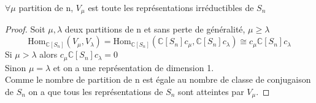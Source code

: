 \begin{theorem}[IrreductibleRepresentationSn]
    \label{IrreductibleRepresentationSn}
    $\forall \mu$ partition de n, $V_{\mu}$ est toute les représentations irréductibles de $S_n$
\end{theorem}
\begin{proof}
    Soit $\mu, \lambda$ deux partitions de n et sans perte de généralité, $\mu \geq \lambda$\\
    \[ \text{Hom}_{\mathbb{C}[S_{n}]}(V_{\mu}, V_{\lambda}) = \text{Hom}_{\mathbb{C}[S_{n}]}(\mathbb{C}[S_{n}]c_{\mu}, \mathbb{C}[S_{n}]c_{\lambda}) \cong c_{\mu}\mathbb{C}[S_{n}]c_{\lambda}  \]
    Si $\mu > \lambda$ alors $c_{\mu}\mathbb{C}[S_{n}]c_{\lambda} = 0$\\
    Sinon $\mu = \lambda$ et on a une représentation de dimension 1.\\
    Comme le nombre de partition de n est égale au nombre de classe de conjugaison de $S_n$ on a que tous les représentations de $S_n$ sont atteintes par $V_{\mu}$.
\end{proof}